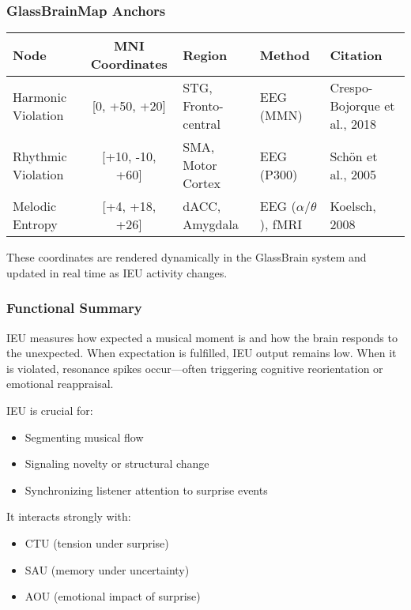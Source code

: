\documentclass[10pt]{article}
\begin{document}
\subsubsection*{GlassBrainMap Anchors}

\begin{center}
\begin{tabular}{|l|c|l|l|l|}
\hline
\textbf{Node} & \textbf{MNI Coordinates} & \textbf{Region} & \textbf{Method} & \textbf{Citation} \\
\hline
Harmonic Violation & [0, +50, +20] & STG, Fronto-central & EEG (MMN) & Crespo-Bojorque et al., 2018 \\
Rhythmic Violation & [+10, -10, +60] & SMA, Motor Cortex & EEG (P300) & Schön et al., 2005 \\
Melodic Entropy & [+4, +18, +26] & dACC, Amygdala & EEG ($\alpha$/$\theta$), fMRI & Koelsch, 2008 \\
\hline
\end{tabular}
\end{center}

These coordinates are rendered dynamically in the GlassBrain system and updated in real time as IEU activity changes.

\subsubsection*{Functional Summary}

IEU measures how expected a musical moment is and how the brain responds to the unexpected. When expectation is fulfilled, IEU output remains low. When it is violated, resonance spikes occur—often triggering cognitive reorientation or emotional reappraisal.

IEU is crucial for:

\begin{itemize}
    \item Segmenting musical flow
    \item Signaling novelty or structural change
    \item Synchronizing listener attention to surprise events
\end{itemize}

It interacts strongly with:

\begin{itemize}
    \item CTU (tension under surprise)
    \item SAU (memory under uncertainty)
    \item AOU (emotional impact of surprise)
\end{itemize}
\end{document}
